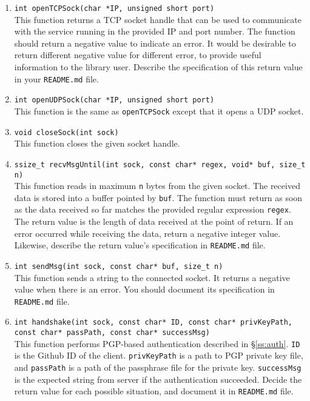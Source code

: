 \documentclass[a4paper, 11pt]{article}
\theoremstyle{definition}
\begin{document}
{\begin{enumerate}
%
  \item \texttt{int openTCPSock(char *IP, unsigned short port)}\\
    This function returns a TCP socket handle that can be used to
    communicate with the service running in the provided IP and port
    number. The function should return a negative value to indicate an
    error. It would be desirable to return different negative value
    for different error, to provide useful information to the library
    user. Describe the specification of this return value in your
    \texttt{README.md} file.
%
  \item \texttt{int openUDPSock(char *IP, unsigned short port)}\\
    This function is the same as \texttt{openTCPSock} except that it
    opens a UDP socket.
%
  \item \texttt{void closeSock(int sock)}\\
    This function closes the given socket handle.
%
  \item \texttt{ssize\_t recvMsgUntil(int sock, const char* regex,
    void* buf, size\_t n)}\\
    This function reads in maximum \texttt{n} bytes from the given
    socket. The received data is stored into a buffer pointed by
    \texttt{buf}. The function must return as soon as the data
    received so far matches the provided regular expression
    \texttt{regex}. The return value is the length of data received at
    the point of return. If an error occurred while receiving the
    data, return a negative integer value. Likewise, describe the
    return value's specification in \texttt{README.md} file.
%
  \item \texttt{int sendMsg(int sock, const char* buf, size\_t n)}\\
    This function sends a string to the connected socket. It returns a
    negative value when there is an error. You should document its
    specification in \texttt{README.md} file.
%
  \item \texttt{int handshake(int sock, const char* ID, const char*
    privKeyPath, const char* passPath, const char* successMsg)}\\
    This function performs PGP-based authentication described in
    \S\ref{ss:auth}. \texttt{ID} is the Github ID of the client.
    \texttt{privKeyPath} is a path to PGP private key file, and
    \texttt{passPath} is a path of the passphrase file for the private
    key. \texttt{successMsg} is the expected string from server if the
    authentication succeeded. Decide the return value for each
    possible situation, and document it in \texttt{README.md} file.
%
\end{enumerate}

}
\end{document}

